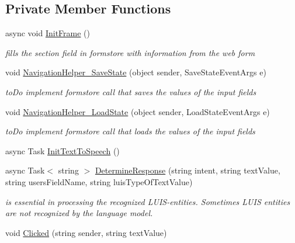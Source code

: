 \subsection*{Private Member Functions}
\begin{DoxyCompactItemize}
\item 
async void \mbox{\hyperlink{class_listen_to_me_1_1_main_page_a45421e24076000d4d47b83b35ee7f45e}{Init\+Frame}} ()
\begin{DoxyCompactList}\small\item\em fills the section field in formstore with information from the web form \end{DoxyCompactList}\item 
void \mbox{\hyperlink{class_listen_to_me_1_1_main_page_aaf8102340fb741eaa5b6c501b423e060}{Navigation\+Helper\+\_\+\+Save\+State}} (object sender, Save\+State\+Event\+Args e)
\begin{DoxyCompactList}\small\item\em to\+Do implement formstore call that saves the values of the input fields \end{DoxyCompactList}\item 
void \mbox{\hyperlink{class_listen_to_me_1_1_main_page_a5d938633b84211b5962e83e1a0077e51}{Navigation\+Helper\+\_\+\+Load\+State}} (object sender, Load\+State\+Event\+Args e)
\begin{DoxyCompactList}\small\item\em to\+Do implement formstore call that loads the values of the input fields \end{DoxyCompactList}\item 
async Task \mbox{\hyperlink{class_listen_to_me_1_1_main_page_a5d7ee17d9ee59cfc8ddee9731415c4c3}{Init\+Text\+To\+Speech}} ()
\item 
async Task$<$ string $>$ \mbox{\hyperlink{class_listen_to_me_1_1_main_page_a6151ec18200a907f2dae7fc2e7d90202}{Determine\+Response}} (string intent, string text\+Value, string users\+Field\+Name, string luis\+Type\+Of\+Text\+Value)
\begin{DoxyCompactList}\small\item\em is essential in processing the recognized L\+U\+I\+S-\/entities. Sometimes L\+U\+IS entities are not recognized by the language model. \end{DoxyCompactList}\item 
void \mbox{\hyperlink{class_listen_to_me_1_1_main_page_a465e7f9723aec19e912a3913841d477e}{Clicked}} (string sender, string text\+Value)
\item 

\end{DoxyCompactItemize}
